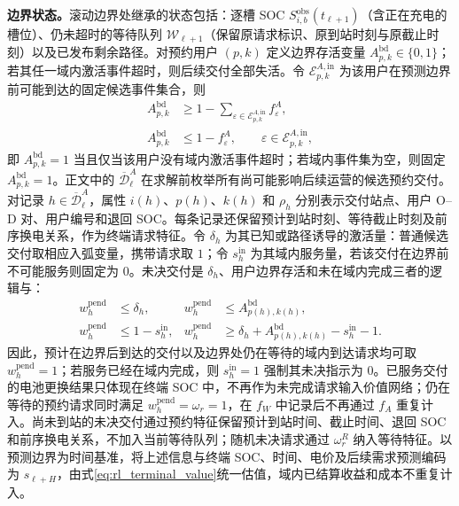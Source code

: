 \documentclass[12pt,a4paper,UTF8]{ctexart}
\begin{document}
\textbf{边界状态。}滚动边界处继承的状态包括：逐槽 SOC $S_{i,b}^{\mathrm{obs}}(t_{\ell+1})$（含正在充电的槽位）、仍未超时的等待队列 $\mathcal W_{\ell+1}$（保留原请求标识、原到站时刻与原截止时刻）以及已发布剩余路径。对预约用户 $(p,k)$ 定义边界存活变量 $A_{p,k}^{\mathrm{bd}}\in\{0,1\}$；若其任一域内激活事件超时，则后续交付全部失活。令 $\mathcal E_{p,k}^{A,\mathrm{in}}$ 为该用户在预测边界前可能到达的固定候选事件集合，则
\begin{subequations}
\label{eq:boundary_alive}
\begin{align}
A_{p,k}^{\mathrm{bd}}
&\ge 1-\sum_{\varepsilon\in\mathcal E_{p,k}^{A,\mathrm{in}}}
f_\varepsilon^A,\\
A_{p,k}^{\mathrm{bd}}
&\le 1-f_\varepsilon^A,
\qquad \varepsilon\in\mathcal E_{p,k}^{A,\mathrm{in}},
\end{align}
\end{subequations}
即 $A_{p,k}^{\mathrm{bd}}=1$ 当且仅当该用户没有域内激活事件超时；若域内事件集为空，则固定 $A_{p,k}^{\mathrm{bd}}=1$。正文中的 $\overline{\mathcal D}_{\ell}^{A}$ 在求解前枚举所有尚可能影响后续运营的候选预约交付。对记录 $h\in\overline{\mathcal D}_{\ell}^{A}$，属性 $i(h)$、$p(h)$、$k(h)$ 和 $\rho_h$ 分别表示交付站点、用户 O--D 对、用户编号和退回 SOC。每条记录还保留预计到站时刻、等待截止时刻及前序换电关系，作为终端请求特征。令 $\delta_h$ 为其已知或路径诱导的激活量：普通候选交付取相应入弧变量，携带请求取 $1$；令 $s_h^{\mathrm{in}}$ 为其域内服务量，若该交付在边界前不可能服务则固定为 $0$。未决交付是 $\delta_h$、用户边界存活和未在域内完成三者的逻辑与：
\begin{subequations}
\label{eq:pending_delivery_alive}
\begin{align}
w_h^{\mathrm{pend}}&\le\delta_h,&
w_h^{\mathrm{pend}}&\le A_{p(h),k(h)}^{\mathrm{bd}},\\
w_h^{\mathrm{pend}}&\le1-s_h^{\mathrm{in}},&
w_h^{\mathrm{pend}}
&\ge\delta_h+A_{p(h),k(h)}^{\mathrm{bd}}
-s_h^{\mathrm{in}}-1.
\end{align}
\end{subequations}
因此，预计在边界后到达的交付以及边界处仍在等待的域内到达请求均可取 $w_h^{\mathrm{pend}}=1$；若服务已经在域内完成，则 $s_h^{\mathrm{in}}=1$ 强制其未决指示为 $0$。已服务交付的电池更换结果只体现在终端 SOC 中，不再作为未完成请求输入价值网络；仍在等待的预约请求同时满足 $w_h^{\mathrm{pend}}=\omega_r=1$，在 $f_W$ 中记录后不再通过 $f_A$ 重复计入。尚未到站的未决交付通过预约特征保留预计到站时间、截止时间、退回 SOC 和前序换电关系，不加入当前等待队列；随机未决请求通过 $\omega_r^R$ 纳入等待特征。以预测边界为时间基准，将上述信息与终端 SOC、时间、电价及后续需求预测编码为 $s_{\ell+H}$，由式\eqref{eq:rl_terminal_value}统一估值，域内已结算收益和成本不重复计入。
\end{document}
